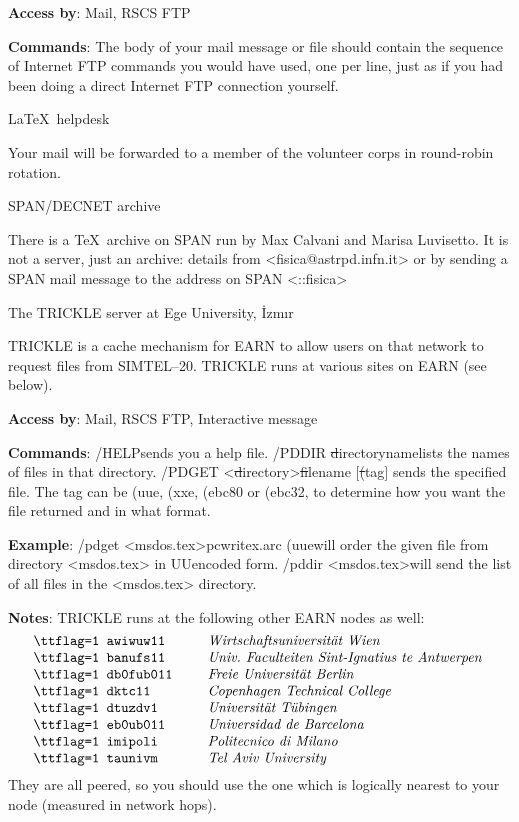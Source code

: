 {\bf Access by}:  Mail, RSCS FTP

{\bf Commands}:  The body of your mail message or file should contain
     the sequence of Internet FTP commands you would have used, one per
     line, just as if you had been doing a direct Internet FTP
     connection yourself.

 {\LaTeX\ helpdesk}

     Your mail will be forwarded to a member of the volunteer corps in
     round-robin rotation.

 {SPAN/DECNET archive}

     There is a \TeX\ archive on SPAN run by Max Calvani and Marisa
     Luvisetto. It is not a server, just an archive: details from
     <{\tx fisica@astrpd.infn.it}> or by sending a SPAN mail message
     to the address on SPAN <{::fisica}>

 {The TRICKLE server at Ege University,
     \.Izm\i r}

     TRICKLE is a cache mechanism for EARN to allow users on that
     network to request files from SIMTEL--20. TRICKLE runs at various
     sites on EARN (see below).

{\bf Access by}:  Mail, RSCS FTP, Interactive message

{\bf Commands}:\nl
{\tx /HELP}\quad sends you a help file.\nl
{\tx /PDDIR} {\st directoryname}\quad lists the names of files in that
     directory.\nl
{\tx /PDGET <}{\st directory}{\tx>}{\st filename} $[${\st (tag\/}$]$
     \quad sends the specified file. The tag can be {\tx (uue}, {\tx
     (xxe}, {\tx (ebc80} or {\tx (ebc32}, to determine how you want the
     file returned and in what format.

{\bf Example}:\nl
{\tx /pdget <msdos.tex>pcwritex.arc (uue}\quad will order the given file
     from directory {\tx <msdos.tex>} in UUencoded form.\nl
{\tx /pddir <msdos.tex>}\quad will send the list of all files in the
     {\tx <msdos.tex>} directory.

{\bf Notes}: TRICKLE runs at the following other EARN nodes as well:
     $$\vbox{\halign{{\tx#}\quad\hfil&\quad{\it#}\hfil           \cr
     awiwuw11  &  Wirtschaftsuniversit\"at Wien                  \cr
     banufs11  &  Univ.\ Faculteiten Sint-Ignatius te Antwerpen  \cr
     db0fub011 &  Freie Universit\"at Berlin                     \cr
     dktc11    &  Copenhagen Technical College                   \cr
     dtuzdv1   &  Universit\"at T\"ubingen                       \cr
     eb0ub011  &  Universidad de Barcelona                       \cr
     imipoli   &  Politecnico di Milano                          \cr
     taunivm   &  Tel Aviv University                            \cr}}$$
     They are all peered, so you should use the one which is logically
     nearest to your node (measured in network hops).

